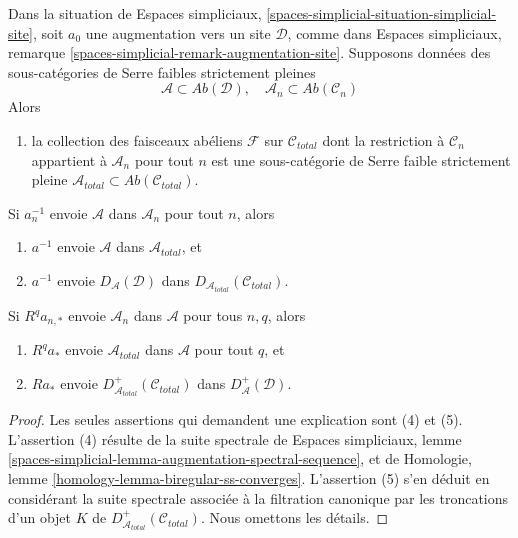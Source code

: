 \begin{lemma}
\label{lemma-trivialities-cohomological-descent-abelian}
Dans la situation de Espaces simpliciaux,
\ref{spaces-simplicial-situation-simplicial-site}, soit $a_0$ une
augmentation vers un site $\mathcal{D}$, comme dans Espaces simpliciaux,
remarque \ref{spaces-simplicial-remark-augmentation-site}.
Supposons données des sous-catégories de Serre faibles strictement pleines
$$
\mathcal{A} \subset \textit{Ab}(\mathcal{D}),\quad
\mathcal{A}_n \subset \textit{Ab}(\mathcal{C}_n)
$$
Alors
\begin{enumerate}
\item[(1)]
la collection des faisceaux abéliens $\mathcal{F}$ sur
$\mathcal{C}_{total}$ dont la restriction à $\mathcal{C}_n$ appartient à
$\mathcal{A}_n$ pour tout $n$ est une sous-catégorie de Serre faible
strictement pleine
$\mathcal{A}_{total} \subset \textit{Ab}(\mathcal{C}_{total})$.
\end{enumerate}
Si $a_n^{-1}$ envoie $\mathcal{A}$ dans $\mathcal{A}_n$ pour tout $n$, alors
\begin{enumerate}
\item[(2)] $a^{-1}$ envoie $\mathcal{A}$ dans $\mathcal{A}_{total}$, et
\item[(3)] $a^{-1}$ envoie $D_\mathcal{A}(\mathcal{D})$ dans
$D_{\mathcal{A}_{total}}(\mathcal{C}_{total})$.
\end{enumerate}
Si $R^qa_{n, *}$ envoie $\mathcal{A}_n$ dans $\mathcal{A}$
pour tous $n, q$, alors
\begin{enumerate}
\item[(4)] $R^qa_*$ envoie $\mathcal{A}_{total}$ dans $\mathcal{A}$ pour tout
$q$, et
\item[(5)] $Ra_*$ envoie
$D_{\mathcal{A}_{total}}^+(\mathcal{C}_{total})$
dans $D_\mathcal{A}^+(\mathcal{D})$.
\end{enumerate}
\end{lemma}

\begin{proof}
Les seules assertions qui demandent une explication sont (4) et (5).
L'assertion (4) résulte de la suite spectrale de Espaces simpliciaux,
lemme \ref{spaces-simplicial-lemma-augmentation-spectral-sequence},
et de Homologie, lemme \ref{homology-lemma-biregular-ss-converges}.
L'assertion (5) s'en déduit en considérant la suite spectrale associée à
la filtration canonique par les troncations d'un objet
$K$ de $D_{\mathcal{A}_{total}}^+(\mathcal{C}_{total})$.
Nous omettons les détails.
\end{proof}

